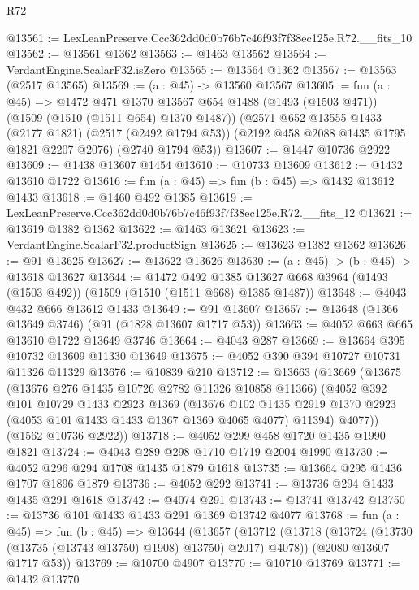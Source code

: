 \begin{lexlean}{R72}
\begin{coremodule}
@13561 := LexLeanPreserve.Ccc362dd0d0b76b7c46f93f7f38ec125e.R72.__fits_10
@13562 := @13561 @1362
@13563 := @1463 @13562
@13564 := VerdantEngine.ScalarF32.isZero
@13565 := @13564 @1362
@13567 := @13563 (@2517 @13565)
@13569 := (a : @45) -> @13560 @13567
@13605 := fun (a : @45) =>
  @1472
    @471
    @1370
    @13567
    @654
    @1488
    (@1493 (@1503 @471))
    (@1509 (@1510 (@1511 @654) @1370 @1487))
    (@2571
      @652
      @13555
      @1433
      (@2177 @1821)
      (@2517 (@2492 @1794 @53))
      (@2192 @458 @2088 @1435 @1795 @1821 @2207 @2076)
      (@2740 @1794 @53))
@13607 := @1447 @10736 @2922
@13609 := @1438 @13607 @1454
@13610 := @10733 @13609
@13612 := @1432 @13610 @1722
@13616 := fun (a : @45) => fun (b : @45) => @1432 @13612 @1433
@13618 := @1460 @492 @1385
@13619 := LexLeanPreserve.Ccc362dd0d0b76b7c46f93f7f38ec125e.R72.__fits_12
@13621 := @13619 @1382 @1362
@13622 := @1463 @13621
@13623 := VerdantEngine.ScalarF32.productSign
@13625 := @13623 @1382 @1362
@13626 := @91 @13625
@13627 := @13622 @13626
@13630 := (a : @45) -> (b : @45) -> @13618 @13627
@13644 := @1472
    @492
    @1385
    @13627
    @668
    @3964
    (@1493 (@1503 @492))
    (@1509 (@1510 (@1511 @668) @1385 @1487))
@13648 := @4043 @432 @666 @13612 @1433
@13649 := @91 @13607
@13657 := @13648 (@1366 @13649 @3746) (@91 (@1828 @13607 @1717 @53))
@13663 := @4052 @663 @665 @13610 @1722 @13649 @3746
@13664 := @4043 @287
@13669 := @13664 @395 @10732 @13609 @11330 @13649
@13675 := @4052 @390 @394 @10727 @10731 @11326 @11329
@13676 := @10839 @210
@13712 := @13663
    (@13669
      (@13675
        (@13676 @276 @1435 @10726 @2782 @11326 @10858 @11366)
        (@4052
          @392
          @101
          @10729
          @1433
          @2923
          @1369
          (@13676
            @102
            @1435
            @2919
            @1370
            @2923
            (@4053 @101 @1433 @1433 @1367 @1369 @4065 @4077)
            @11394)
          @4077))
      (@1562 @10736 @2922))
@13718 := @4052 @299 @458 @1720 @1435 @1990 @1821
@13724 := @4043 @289 @298 @1710 @1719 @2004 @1990
@13730 := @4052 @296 @294 @1708 @1435 @1879 @1618
@13735 := @13664 @295 @1436 @1707 @1896 @1879
@13736 := @4052 @292
@13741 := @13736 @294 @1433 @1435 @291 @1618
@13742 := @4074 @291
@13743 := @13741 @13742
@13750 := @13736 @101 @1433 @1433 @291 @1369 @13742 @4077
@13768 := fun (a : @45) =>
  fun (b : @45) =>
  @13644
    (@13657
      (@13712 (@13718 (@13724 (@13730 (@13735 (@13743 @13750) @1908) @13750) @2017) @4078))
      (@2080 @13607 @1717 @53))
@13769 := @10700 @4907
@13770 := @10710 @13769
@13771 := @1432 @13770

\end{coremodule}
\end{lexlean}
